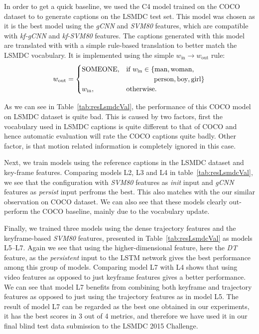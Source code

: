 In order to get a quick baseline, we used the C4 model trained on the COCO
dataset to to generate captions on the LSMDC test set.
This model was chosen as it is the best model using the \emph{gCNN} and
\emph{SVM80} features, which are compatible with \emph{kf-gCNN} and
\emph{kf-SVM80} features.
The captions generated with this model are translated with with a simple
rule-based translation to better match the LSMDC vocabulary.
It is implemented using the simple%
$w_{\text{in}} \longrightarrow w_{\text{out}}$ rule:
\begin{align} \label{eqTrans} w_{\text{out}} = \begin{cases} \text{SOMEONE},&
\text{if } w_{\text{in}} \in \{\text{man}, \text{woman}, \\&
\text{\mbox{\qquad\qquad person}}, \text{boy}, \text{girl} \}\\ w_{\text{in}},&
\text{otherwise.} \end{cases} \end{align}

As we can see in Table~\ref{tab:resLsmdcVal}, the performance of this COCO model
on LSMDC dataset is quite bad.
This is caused by two factors, first the vocabulary used in LSMDC captions is
quite different to that of COCO and hence automatic evaluation will rate the
COCO captions quite badly.
Other factor, is that motion related information is completely ignored in this
case.

Next, we train models using the reference captions in the LSMDC dataset and
key-frame features.
Comparing models L2, L3 and L4 in table~\ref{tab:resLsmdcVal}, we see that
the configuration with \emph{SVM80} features as \emph{init} input and
\emph{gCNN} features as \emph{persist} input perfroms the best.
This also matches with the our similar observation on COCO dataset.
We can also see that these models clearly out-perform the COCO baseline, mainly
due to the vocabulary update.

Finally, we trained three models using the dense trajectory features and the
keyframe-based \emph{SVM80} features, presented in Table~\ref{tab:resLsmdcVal}
as models L5--L7. 
Again we see that using the higher-dimensional feature, here the \emph{DT}
feature, as the \emph{persistent} input to the LSTM network gives the best
performance among this group of models.
Comparing model L7 with L4 shows that using video features as opposed to just
keyframe features gives a better performance.
We can see that model L7 benefits from combining both keyframe and trajectory
features as opposed to just using the trajectory features as in model L5.
The result of model L7 can be regarded as the best one obtained in our
experiments, it has the best scores in 3 out of 4 metrics, and therefore we have
used it in our final blind test data submission to the LSMDC 2015 Challenge.

